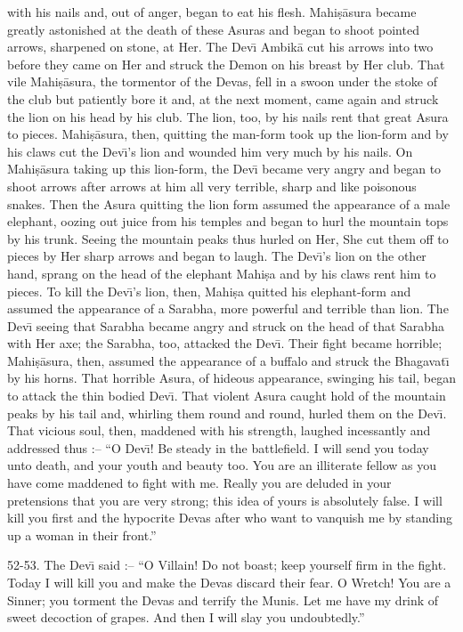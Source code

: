 with his nails and, out of anger, began to eat his flesh. Mahi\d{s}\=asura became greatly astonished at the death of these Asuras and began to shoot pointed arrows, sharpened on stone, at Her. The Dev\={\i} Ambik\=a cut his arrows into two before they came on Her and struck the Demon on his breast by Her club. That vile Mahi\d{s}\=asura, the tormentor of the Devas, fell in a swoon under the stoke of the club but patiently bore it and, at the next moment, came again and struck the lion on his head by his club. The lion, too, by his nails rent that great Asura to pieces. Mahi\d{s}\=asura, then, quitting the man-form took up the lion-form and by his claws cut the Dev\={\i}'s lion and wounded him very much by his nails. On Mahi\d{s}\=asura taking up this lion-form, the Dev\={\i} became very angry and began to shoot arrows after arrows at him all very terrible, sharp and like poisonous snakes. Then the Asura quitting the lion form assumed the appearance of a male elephant, oozing out juice from his temples and began to hurl the mountain tops by his trunk. Seeing the mountain peaks thus hurled on Her, She cut them off to pieces by Her sharp arrows and began to laugh. The Dev\={\i}'s lion on the other hand, sprang on the head of the elephant Mahi\d{s}a and by his claws rent him to pieces. To kill the Dev\={\i}'s lion, then, Mahi\d{s}a quitted his elephant-form and assumed the appearance of a Sarabha, more powerful and terrible than lion. The Dev\={\i} seeing that Sarabha became angry and struck on the head of that Sarabha with Her axe; the Sarabha, too, attacked the Dev\={\i}. Their fight became horrible; Mahi\d{s}\=asura, then, assumed the appearance of a buffalo and struck the Bhagavat\={\i} by his horns. That horrible Asura, of hideous appearance, swinging his tail, began to attack the thin bodied Dev\={\i}. That violent Asura caught hold of the mountain peaks by his tail and, whirling them round and round, hurled them on the Dev\={\i}. That vicious soul, then, maddened with his strength, laughed incessantly and addressed thus :-- ``O Dev\={\i}! Be steady in the battlefield. I will send you today unto death, and your youth and beauty too. You are an illiterate fellow as you have come maddened to fight with me. Really you are deluded in your pretensions that you are very strong; this idea of yours is absolutely false. I will kill you first and the hypocrite Devas after who want to vanquish me by standing up a woman in their front.''

52-53. The Dev\={\i} said :-- ``O Villain! Do not boast; keep yourself firm in the fight. Today I will kill you and make the Devas discard their fear. O Wretch! You are a Sinner; you torment the Devas and terrify the Munis. Let me have my drink of sweet decoction of grapes. And then I will slay you undoubtedly.''

